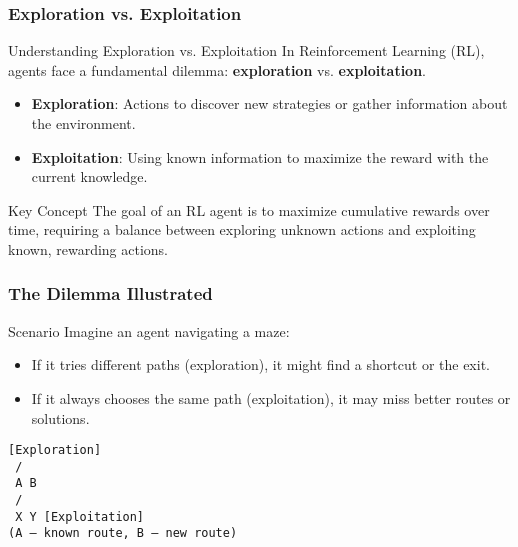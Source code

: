 \documentclass[aspectratio=169]{beamer}
\begin{document}
\begin{frame}[fragile]
    \frametitle{Exploration vs. Exploitation}
    \begin{block}{Understanding Exploration vs. Exploitation}
        In Reinforcement Learning (RL), agents face a fundamental dilemma: 
        \textbf{exploration} vs. \textbf{exploitation}.
    \end{block}
    \begin{itemize}
        \item \textbf{Exploration}: Actions to discover new strategies or gather information about the environment.
        \item \textbf{Exploitation}: Using known information to maximize the reward with the current knowledge.
    \end{itemize}
    \begin{block}{Key Concept}
        The goal of an RL agent is to maximize cumulative rewards over time, requiring a balance between exploring unknown actions and exploiting known, rewarding actions.
    \end{block}
\end{frame}

\begin{frame}[fragile]
    \frametitle{The Dilemma Illustrated}
    \begin{block}{Scenario}
        Imagine an agent navigating a maze:
        \begin{itemize}
            \item If it tries different paths (exploration), it might find a shortcut or the exit.
            \item If it always chooses the same path (exploitation), it may miss better routes or solutions.
        \end{itemize}
    \end{block}
    \begin{center}
        \texttt{[Exploration]} \\
        \texttt{    /   \\} 
        \texttt{   A     B} \\
        \texttt{  /       \\} 
        \texttt{ X         Y  [Exploitation]} \\
        \texttt{(A – known route, B – new route)}
    \end{center}
\end{frame}
\end{document}
